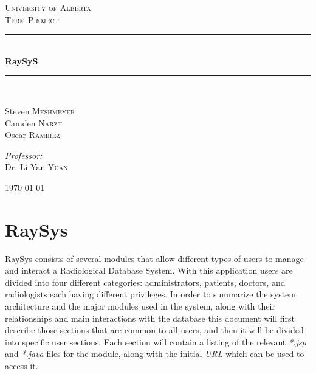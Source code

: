 \documentclass[11pt]{report}
\newcommand{\HRule}{\rule{\linewidth}{0.5mm}}
\begin{document}
\begin{titlepage}

\begin{center}


\textsc{\LARGE University of Alberta}\\[1.5cm]

\textsc{\Large Term Project}\\[0.5cm]


\HRule \\[0.4cm]
{ \huge \bfseries RaySyS}\\[0.4cm]

\HRule \\[1.5cm]

\begin{minipage}{0.4\textwidth}
\begin{flushleft} \large
Steven  \textsc{Meshmeyer}\\
Camden  \textsc{Narzt}\\
Oscar  \textsc{Ramirez}
\end{flushleft}
\end{minipage}
\begin{minipage}{0.4\textwidth}
\begin{flushright} \large
\emph{Professor:} \\
Dr. Li-Yan \textsc{Yuan}
\end{flushright}


\end{minipage}

\vfill

{\large \today}

\end{center}

\end{titlepage}
\chapter*{RaySys}
RaySys consists of several modules that allow different types of users to manage and interact a Radiological Database System. With this application users are divided into four different categories: administrators, patients, doctors, and radiologists each having different privileges. In order to summarize the system architecture and the major modules used in the system, along with their relationships and main interactions with the database this document will first describe those sections that are common to all users, and then it will be divided into specific user sections. Each section will contain a listing of the relevant \emph{*.jsp} and \emph{*.java} files for the module, along with the initial \emph{URL} which can be used to access it.
\end{document}

